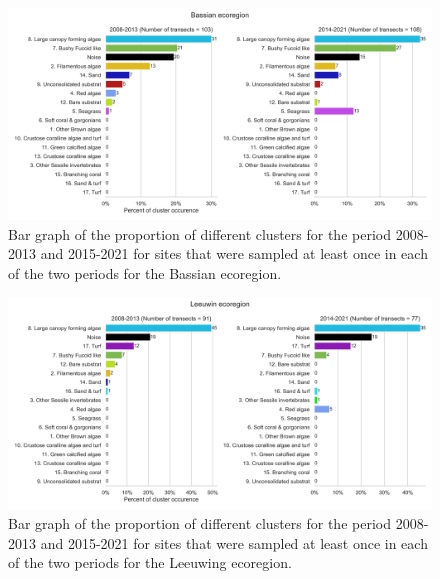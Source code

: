 \begin{figure}
\hypertarget{fig:chap2figS39}{%
\centering
\includegraphics{03-Chapitre2/figures/supplementary/08-temporal_change_ecoregion_Bassian.png}
\caption{Bar graph of the proportion of different clusters for the
period 2008-2013 and 2015-2021 for sites that were sampled at least once
in each of the two periods for the Bassian
ecoregion.}\label{fig:chap2figS39}
}
\end{figure}

\begin{figure}
\hypertarget{fig:chap2figS41}{%
\centering
\includegraphics{03-Chapitre2/figures/supplementary/08-temporal_change_ecoregion_Leeuwin.png}
\caption{Bar graph of the proportion of different clusters for the
period 2008-2013 and 2015-2021 for sites that were sampled at least once
in each of the two periods for the Leeuwing
ecoregion.}\label{fig:chap2figS41}
}
\end{figure}

